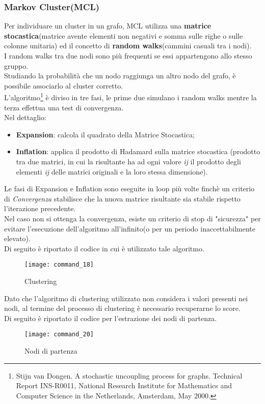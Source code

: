 \subsubsection*{Markov Cluster(MCL)}
Per individuare un cluster in un grafo, MCL utilizza una \textbf{matrice stocastica}(matrice
avente elementi non negativi e somma sulle righe o sulle colonne unitaria) ed
il concetto di \textbf{random walks}(cammini casuali tra i nodi).\\
I random walks tra due nodi sono più frequenti se essi appartengono allo stesso gruppo.\\
Studiando la probabilità che un nodo raggiunga un altro nodo del grafo, è possibile
associarlo al cluster corretto.\\
L'algoritmo\footnote{Stijn van Dongen. A stochastic uncoupling process for graphs.
Technical Report INS-R0011, National Research Institute for Mathematics and Computer
Science in the Netherlands, Amsterdam, May 2000.} è diviso in tre fasi, le prime
due simulano i random walks mentre la terza effettua una test di convergenza.\\
Nel dettaglio:
\begin{itemize}
  \item \textbf{Expansion}: calcola il quadrato della Matrice Stocastica;
	\item \textbf{Inflation}: applica il prodotto di Hadamard sulla matrice stocastica
	(prodotto tra due matrici, in cui la risultante ha ad ogni valore \textit{ij} il prodotto
	degli elementi \textit{ij} delle matrici originali e la loro stessa dimensione).
\end{itemize}
Le fasi di Expansion e Inflation sono eseguite in loop più volte finchè un criterio
di \textit{Convergenza} stabilisce che la nuova matrice risultante sia stabile
rispetto l'iterazione precedente.\\
Nel caso non si ottenga la convergenza, esiste un criterio di stop di "sicurezza"
per evitare l'esecuzione dell'algoritmo all'infinito(o per un periodo
inaccettabilmente elevato).\\
Di seguito è riportato il codice in cui è utilizzato tale algoritmo.
\begin{figure}[!htbp]
  \texttt{[image: command\_18]}
  \caption{Clustering}
  \label{command_18}
\end{figure}

\clearpage
Dato che l'algoritmo di clustering utilizzato non considera i valori presenti nei
nodi, al termine del processo di clustering è necessario recuperarne lo score.\\
Di seguito è riportato il codice per l'estrazione dei nodi di partenza.
\begin{figure}[!htbp]
  \texttt{[image: command\_20]}
  \caption{Nodi di partenza}
  \label{command_20}
\end{figure}

